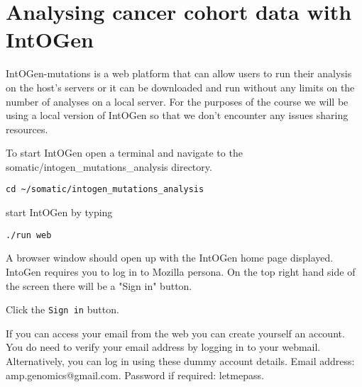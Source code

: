 
\section{Analysing cancer cohort data with IntOGen}

\begin{information}
IntOGen-mutations is a web platform that can allow users to run their analysis on the
host's servers or it can be downloaded and run without any limits on the number of
analyses on a local server.
\vspace{4 mm]}
For the purposes of the course we will be using a local version of IntOGen so that we
don't encounter any issues sharing resources.
\end{information}

\begin{steps}
To start IntOGen open a terminal and navigate to the somatic/intogen\_mutations\_analysis directory.
\begin{lstlisting}
cd ~/somatic/intogen_mutations_analysis
\end{lstlisting}
\vspace{4 mm]}
start IntOGen by typing
\begin{lstlisting}
./run web
\end{lstlisting}
\end{steps}

\begin{information}
A browser window should open up with the IntOGen home page displayed. 
IntoGen requires you to log in to Mozilla persona.
\vspace{4 mm]}
On the top right hand side of the screen there will be a "Sign in" button.
\end{information}

\begin{steps}
Click the \texttt{Sign in} button.
\end{steps}

If you can access your email from the web you can create yourself an account. 
You do need to verify your email address by logging in to your webmail.
\vspace{4 mm]}
Alternatively, you can log in using these dummy account details.
\hspace{5mm} Email address:\hspace{10mm} amp.genomics@gmail.com.
\hspace{5mm} Password if required:\hspace{5mm} letmepass.

